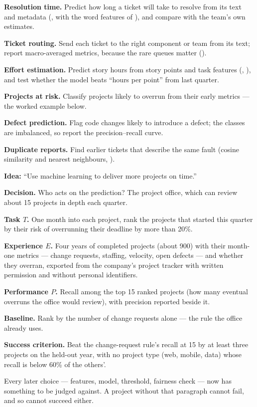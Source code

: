 \begin{conceptbox}
\begin{tight}
  \item \textbf{Resolution time.} Predict how long a ticket will take to resolve
        from its text and metadata (, with the word features of
        ), and compare with the team's own estimates.
  \item \textbf{Ticket routing.} Send each ticket to the right component or team
        from its text; report macro-averaged metrics, because the rare queues matter
        ().
  \item \textbf{Effort estimation.} Predict story hours from story points and task
        features (, ), and test whether the model beats
        ``hours per point'' from last quarter.
  \item \textbf{Projects at risk.} Classify projects likely to overrun from their
        early metrics --- the worked example below.
  \item \textbf{Defect prediction.} Flag code changes likely to introduce a defect;
        the classes are imbalanced, so report the precision--recall curve.
  \item \textbf{Duplicate reports.} Find earlier tickets that describe the same
        fault (cosine similarity and nearest neighbours, ).
\end{tight}
\end{conceptbox}

\begin{worked}
\textbf{Idea:} ``Use machine learning to deliver more projects on time.''

\smallskip
\textbf{Decision.} Who acts on the prediction? The project office, which can review
about 15 projects in depth each quarter.

\textbf{Task $T$.} One month into each project, rank the projects that started this
quarter by their risk of overrunning their deadline by more than 20\%.

\textbf{Experience $E$.} Four years of completed projects (about 900) with their
month-one metrics --- change requests, staffing, velocity, open defects --- and whether
they overran, exported from the company's project tracker with written permission and
without personal identifiers.

\textbf{Performance $P$.} Recall among the top 15 ranked projects (how many eventual
overruns the office would review), with precision reported beside it.

\textbf{Baseline.} Rank by the number of change requests alone --- the rule the office
already uses.

\textbf{Success criterion.} Beat the change-request rule's recall at 15 by at least
three projects on the held-out year, with no project type (web, mobile, data) whose
recall is below 60\% of the others'.

\smallskip
Every later choice --- features, model, threshold, fairness check --- now has
something to be judged against. A project without that paragraph cannot fail, and so
cannot succeed either.
\end{worked}

